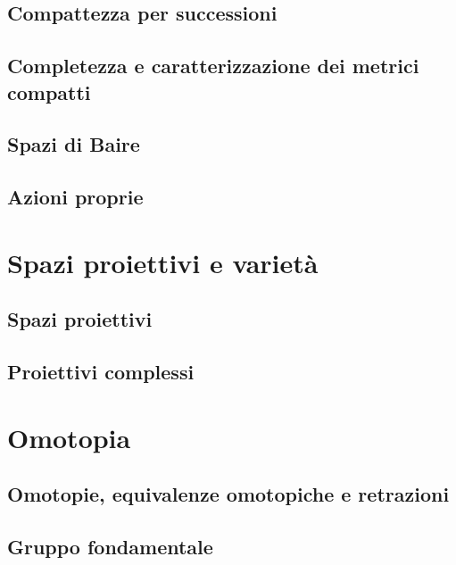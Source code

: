 \documentclass{article}
\begin{document}
\subsection{Compattezza per successioni}


\subsection{Completezza e caratterizzazione dei metrici compatti}


\subsection{Spazi di Baire}


\subsection{Azioni proprie}


\section{Spazi proiettivi e varietà}

\subsection{Spazi proiettivi}


\subsection{Proiettivi complessi}


\section{Omotopia}

\subsection{Omotopie, equivalenze omotopiche e retrazioni}


\subsection{Gruppo fondamentale}

\end{document}
